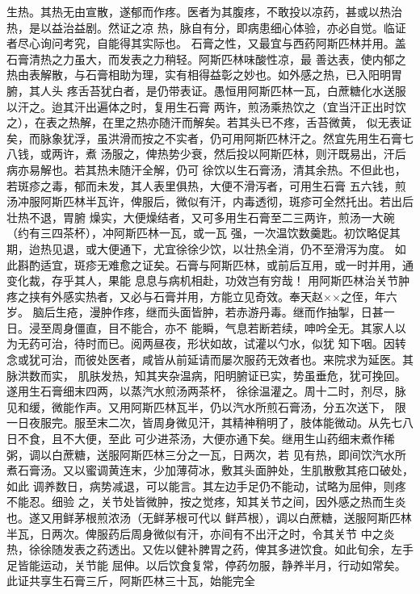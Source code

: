 \documentclass[a4paper,12pt,UTF8,twoside]{ctexbook}
\begin{document}
生热。其热无由宣散，遂郁而作疼。医者为其腹疼，不敢投以凉药，甚或以热治热，是以益治益剧。然证之凉 
热，脉自有分，即病患细心体验，亦必自觉。临证者尽心询问考究，自能得其实际也。 
石膏之性，又最宜与西药阿斯匹林并用。盖石膏清热之力虽大，而发表之力稍轻。阿斯匹林味酸性凉，最 
善达表，使内郁之热由表解散，与石膏相助为理，实有相得益彰之妙也。如外感之热，已入阳明胃腑，其人头 
疼舌苔犹白者，是仍带表证。愚恒用阿斯匹林一瓦，白蔗糖化水送服以汗之。迨其汗出遍体之时，复用生石膏 
两许，煎汤乘热饮之（宜当汗正出时饮之），在表之热解，在里之热亦随汗而解矣。若其头已不疼，舌苔微黄， 
似无表证矣，而脉象犹浮，虽洪滑而按之不实者，仍可用阿斯匹林汗之。然宜先用生石膏七八钱，或两许，煮 
汤服之，俾热势少衰，然后投以阿斯匹林，则汗既易出，汗后病亦易解也。若其热未随汗全解，仍可 
徐饮以生石膏汤，清其余热。不但此也，若斑疹之毒，郁而未发，其人表里俱热，大便不滑泻者，可用生石膏 
五六钱，煎汤冲服阿斯匹林半瓦许，俾服后，微似有汗，内毒透彻，斑疹可全然托出。若出后壮热不退，胃腑 
燥实，大便燥结者，又可多用生石膏至二三两许，煎汤一大碗（约有三四茶杯），冲阿斯匹林一瓦，或一瓦 
强，一次温饮数羹匙。初饮略促其期，迨热见退，或大便通下，尤宜徐徐少饮，以壮热全消，仍不至滑泻为度。 
如此斟酌适宜，斑疹无难愈之证矣。石膏与阿斯匹林，或前后互用，或一时并用，通变化裁，存乎其人，果能 
息息与病机相赴，功效岂有穷哉！ 
用阿斯匹林治关节肿疼之挟有外感实热者，又必与石膏并用，方能立见奇效。奉天赵××之侄，年六岁。 
脑后生疮，漫肿作疼，继而头面皆肿，若赤游丹毒。继而作抽掣，日甚一日。浸至周身僵直，目不能合，亦不 
能瞬，气息若断若续，呻吟全无。其家人以为无药可治，待时而已。阅两昼夜，形状如故，试灌以勺水，似犹 
知下咽。因转念或犹可治，而彼处医者，咸皆从前延请而屡次服药无效者也。来院求为延医。其脉洪数而实， 
肌肤发热，知其夹杂温病，阳明腑证已实，势虽垂危，犹可挽回。遂用生石膏细末四两，以蒸汽水煎汤两茶杯， 
徐徐温灌之。周十二时，剂尽，脉见和缓，微能作声。又用阿斯匹林瓦半，仍以汽水所煎石膏汤，分五次送下， 
限一日夜服完。服至末二次，皆周身微见汗，其精神稍明了，肢体能微动。从先七八日不食，且不大便，至此 
可少进茶汤，大便亦通下矣。继用生山药细末煮作稀粥，调以白蔗糖，送服阿斯匹林三分之一瓦，日两次，若 
见有热，即间饮汽水所煮石膏汤。又以蜜调黄连末，少加薄荷冰，敷其头面肿处，生肌散敷其疮口破处，如此 
调养数日，病势减退，可以能言。其左边手足仍不能动，试略为屈伸，则疼不能忍。细验 
之，关节处皆微肿，按之觉疼，知其关节之间，因外感之热而生炎也。遂又用鲜茅根煎浓汤（无鲜茅根可代以 
鲜芦根），调以白蔗糖，送服阿斯匹林半瓦，日两次。俾服药后周身微似有汗，亦间有不出汗之时，令其关节 
中之炎热，徐徐随发表之药透出。又佐以健补脾胃之药，俾其多进饮食。如此旬余，左手足皆能运动，关节能 
屈伸。以后饮食复常，停药勿服，静养半月，行动如常矣。此证共享生石膏三斤，阿斯匹林三十瓦，始能完全 
\end{document}
